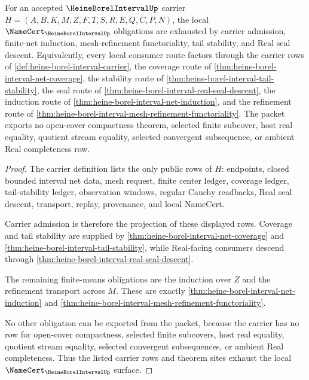 \begin{theorem}
\label{thm:heine-borel-interval-namecert-obligation-surface}
For an accepted $\HeineBorelIntervalUp$ carrier $H=(A,B,K,M,Z,F,T,S,R,E,Q,C,P,N)$, the local $\NameCert_{\HeineBorelIntervalUp}$ obligations are exhausted by carrier admission, finite-net induction, mesh-refinement functoriality, tail stability, and Real seal descent. Equivalently, every local consumer route factors through the carrier rows of \autoref{def:heine-borel-interval-carrier}, the coverage route of \autoref{thm:heine-borel-interval-net-coverage}, the stability route of \autoref{thm:heine-borel-interval-tail-stability}, the seal route of \autoref{thm:heine-borel-interval-real-seal-descent}, the induction route of \autoref{thm:heine-borel-interval-net-induction}, and the refinement route of \autoref{thm:heine-borel-interval-mesh-refinement-functoriality}. The packet exports no open-cover compactness theorem, selected finite subcover, host real equality, quotient stream equality, selected convergent subsequence, or ambient Real completeness row.
\end{theorem}
\begin{proof}
The carrier definition lists the only public rows of $H$: endpoints, closed bounded interval net data, mesh request, finite center ledger, coverage ledger, tail-stability ledger, observation windows, regular Cauchy readbacks, Real seal descent, transport, replay, provenance, and local NameCert.

Carrier admission is therefore the projection of these displayed rows. Coverage and tail stability are supplied by \autoref{thm:heine-borel-interval-net-coverage} and \autoref{thm:heine-borel-interval-tail-stability}, while Real-facing consumers descend through \autoref{thm:heine-borel-interval-real-seal-descent}.

The remaining finite-means obligations are the induction over $Z$ and the refinement transport across $M$. These are exactly \autoref{thm:heine-borel-interval-net-induction} and \autoref{thm:heine-borel-interval-mesh-refinement-functoriality}.

No other obligation can be exported from the packet, because the carrier has no row for open-cover compactness, selected finite subcovers, host real equality, quotient stream equality, selected convergent subsequences, or ambient Real completeness. Thus the listed carrier rows and theorem sites exhaust the local $\NameCert_{\HeineBorelIntervalUp}$ surface.
\end{proof}

